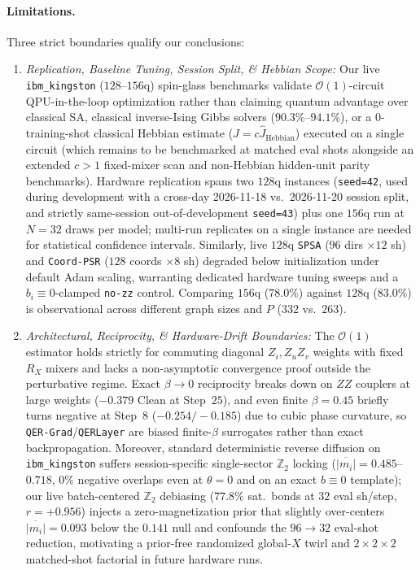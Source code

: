 \documentclass[11pt]{article}
\begin{document}
\paragraph{Limitations.}
Three strict boundaries qualify our conclusions:
\begin{enumerate}[leftmargin=1.4em,itemsep=2pt,topsep=2pt]
  \item \emph{Replication, Baseline Tuning, Session Split, \& Hebbian Scope:} Our live \texttt{ibm\_kingston} ($128$--$156$q) spin-glass benchmarks validate $\mathcal{O}(1)$-circuit QPU-in-the-loop optimization rather than claiming quantum advantage over classical SA, classical inverse-Ising Gibbs solvers ($90.3\%$--$94.1\%$), or a $0$-training-shot classical Hebbian estimate ($J{=}c\hat{J}_{\text{Hebbian}}$) executed on a single circuit (which remains to be benchmarked at matched eval shots alongside an extended $c{>}1$ fixed-mixer scan and non-Hebbian hidden-unit parity benchmarks). Hardware replication spans two $128$q instances (\texttt{seed=42}, used during development with a cross-day 2026-11-18 vs.\ 2026-11-20 session split, and strictly same-session out-of-development \texttt{seed=43}) plus one $156$q run at $N{=}32$ draws per model; multi-run replicates on a single instance are needed for statistical confidence intervals. Similarly, live $128$q \texttt{SPSA} ($96$ dirs $\times 12$ sh) and \texttt{Coord-PSR} ($128$ coords $\times 8$ sh) degraded below initialization under default Adam scaling, warranting dedicated hardware tuning sweeps and a $b_i{\equiv}0$-clamped \texttt{no-zz} control. Comparing $156$q ($78.0\%$) against $128$q ($83.0\%$) is observational across different graph sizes and $P$ ($332$ vs.\ $263$).
  \item \emph{Architectural, Reciprocity, \& Hardware-Drift Boundaries:} The $\mathcal{O}(1)$ estimator holds strictly for commuting diagonal $Z_i, Z_u Z_v$ weights with fixed $R_X$ mixers and lacks a non-asymptotic convergence proof outside the perturbative regime. Exact $\beta{\to}0$ reciprocity breaks down on $ZZ$ couplers at large weights ($-0.379$ Clean at Step~$25$), and even finite $\beta{=}0.45$ briefly turns negative at Step~$8$ ($-0.254 / -0.185$) due to cubic phase curvature, so \texttt{QER-Grad}/\texttt{QERLayer} are biased finite-$\beta$ surrogates rather than exact backpropagation. Moreover, standard deterministic reverse diffusion on \texttt{ibm\_kingston} suffers session-specific single-sector $\mathbb{Z}_2$ locking ($\overline{|m_i|}{=}0.485$--$0.718$, $0\%$ negative overlaps even at $\theta{=}0$ and on an exact $b{\equiv}0$ template); our live batch-centered $\mathbb{Z}_2$ debiasing ($77.8\%$ sat.\ bonds at $32$ eval sh/step, $r{=}+0.956$) injects a zero-magnetization prior that slightly over-centers $\overline{|m_i|}{=}0.093$ below the $0.141$ null and confounds the $96{\to}32$ eval-shot reduction, motivating a prior-free randomized global-$X$ twirl and $2{\times}2{\times}2$ matched-shot factorial in future hardware runs.

\end{enumerate}
\end{document}
